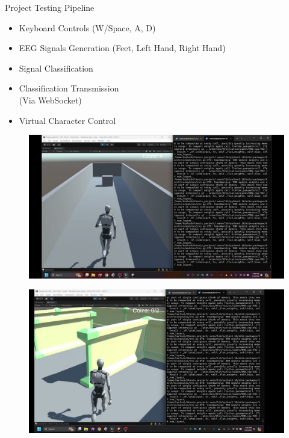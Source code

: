 \begin{frame}{Project Testing Pipeline}
    \begin{minipage}[c]{.65\textwidth}
        \begin{itemize}
            \item Keyboard Controls (W/Space, A, D)
            \item EEG Signals Generation (Feet, Left Hand, Right Hand)
            \item Signal Classification
            \item Classification Transmission\\(Via WebSocket)
            \item Virtual Character Control
        \end{itemize}
    \end{minipage}
    \begin{minipage}[c]{.33\textwidth}
        \begin{figure}[htpb!]
            \centering
            \href{https://youtu.be/13iwuG1pyk0}{%
            \includegraphics[width=\textwidth]{figures/gameplay/infinite_runner}%
            }
        \end{figure}
        \begin{figure}[htpb!]
            \centering
            \href{https://youtu.be/aBgP87yz1Lw}{%
            \includegraphics[width=\textwidth]{figures/gameplay/maze}%
            }
        \end{figure}
    \end{minipage}
\end{frame}

